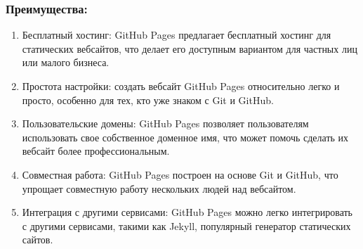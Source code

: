 \documentclass[letterpaper,10pt,russian]{sphinxmanual}
\begin{document}
\subsubsection{Преимущества:}
\label{\detokenize{educational_materials/github_pages/content:id3}}\begin{enumerate}
%
\item {} 
\sphinxAtStartPar
Бесплатный хостинг: GitHub Pages предлагает бесплатный хостинг для статических веб\sphinxhyphen{}сайтов, что делает его доступным вариантом для частных лиц или малого бизнеса.

\item {} 
\sphinxAtStartPar
Простота настройки: создать веб\sphinxhyphen{}сайт GitHub Pages относительно легко и просто, особенно для тех, кто уже знаком с Git и GitHub.

\item {} 
\sphinxAtStartPar
Пользовательские домены: GitHub Pages позволяет пользователям использовать свое собственное доменное имя, что может помочь сделать их веб\sphinxhyphen{}сайт более профессиональным.

\item {} 
\sphinxAtStartPar
Совместная работа: GitHub Pages построен на основе Git и GitHub, что упрощает совместную работу нескольких людей над веб\sphinxhyphen{}сайтом.

\item {} 
\sphinxAtStartPar
Интеграция с другими сервисами: GitHub Pages можно легко интегрировать с другими сервисами, такими как Jekyll, популярный генератор статических сайтов.

\end{enumerate}
\end{document}
